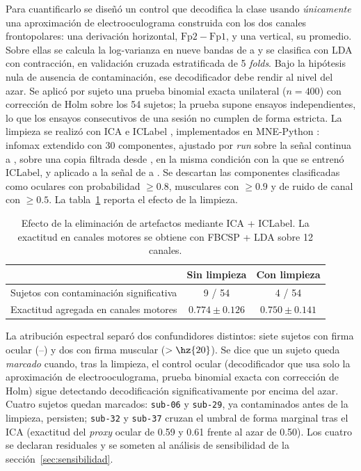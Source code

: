 Para cuantificarlo se diseñó un control que decodifica la clase usando
\emph{únicamente} una aproximación de electrooculograma construida con los dos canales
frontopolares: una derivación horizontal, $\mathrm{Fp2}-\mathrm{Fp1}$, y una vertical, su
promedio. Sobre ellas se calcula la log-varianza en nueve bandas de  a  y se
clasifica con LDA con contracción, en validación cruzada estratificada de 5 \textit{folds}. Bajo
la hipótesis nula de ausencia de contaminación, ese decodificador debe rendir al
nivel del azar. Se aplicó por sujeto una prueba binomial exacta unilateral ($n = 400$) con
corrección de Holm \cite{holm1979} sobre los 54 sujetos; la prueba supone ensayos
independientes, lo que los ensayos consecutivos de una sesión no cumplen de forma estricta.
La limpieza se realizó con ICA e ICLabel \cite{pion2019iclabel}, implementados en
MNE-Python \cite{gramfort2013mne}: infomax extendido
con 30 componentes, ajustado por \textit{run} sobre la señal continua a , sobre una
copia filtrada desde , en la misma condición
con la que se entrenó ICLabel, y aplicado a la señal de  a . Se descartan las
componentes clasificadas como oculares con probabilidad $\geq 0.8$, musculares con
$\geq 0.9$ y de ruido de canal con $\geq 0.5$. La tabla~\ref{tab:artefactos} reporta el
efecto de la limpieza.

\begin{table}[H]
\centering
\caption{Efecto de la eliminación de artefactos mediante ICA + ICLabel. La exactitud en
canales motores se obtiene con FBCSP + LDA sobre 12 canales.}
\label{tab:artefactos}
\begin{tabular}{lcc}
\toprule
 & \textbf{Sin limpieza} & \textbf{Con limpieza} \\
\midrule
Sujetos con contaminación significativa & 9 / 54 & 4 / 54 \\
Exactitud agregada en canales motores   & $0.774 \pm 0.126$  & $0.750 \pm 0.141$ \\
\bottomrule
\end{tabular}
\end{table}

La atribución espectral separó dos confundidores distintos: siete sujetos con
firma ocular (--) y dos con firma muscular ($>\hz{20}$). Se dice que
un sujeto queda \emph{marcado} cuando, tras la limpieza, el control ocular
(decodificador que usa solo la aproximación de electrooculograma, prueba binomial exacta con
corrección de Holm) sigue detectando decodificación significativamente por encima
del azar. Cuatro sujetos quedan marcados: \texttt{sub-06} y \texttt{sub-29}, ya
contaminados antes de la limpieza, persisten; \texttt{sub-32} y \texttt{sub-37}
cruzan el umbral de forma marginal tras el ICA (exactitud del \textit{proxy} ocular
de 0.59 y 0.61 frente al azar de 0.50). Los cuatro se declaran residuales y se
someten al análisis de sensibilidad de la sección~\ref{sec:sensibilidad}.

